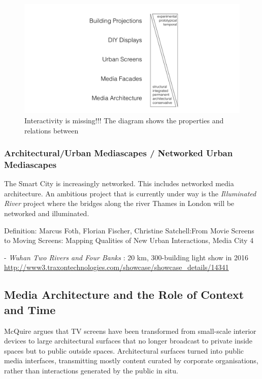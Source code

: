 
\begin{figure}[htp]
\centering
\includegraphics[width=\textwidth]{Illustrations/Typo_diagram.png}
\caption{Interactivity is missing!!! The diagram shows the properties and relations between }
\label{Typo_diagram}
\end{figure}


\subsubsection{Architectural/Urban Mediascapes  / Networked Urban Mediascapes}

The Smart City is increasingly networked. 
This includes networked media architecture.
An ambitious project that is currently under way is the \textit{Illuminated River}  project where the bridges along the river Thames in London will be networked and illuminated.

Definition:
Marcus Foth, Florian Fischer, Christine Satchell:From Movie Screens to Moving Screens: Mapping Qualities of New Urban Interactions, Media City 4


- \textit{Wuhan Two Rivers and Four Banks} : 20 km, 300-building light show in 2016  \url{http://www3.traxontechnologies.com/showcase/showcase_details/14341}



\subsection {Media Architecture and the Role of Context and Time}

McQuire \cite{McQuire2006} argues that TV screens have been transformed from small-scale interior devices to large architectural surfaces that no longer broadcast to private inside spaces but to public outside spaces. Architectural surfaces turned into public media interfaces, transmitting mostly content curated by corporate organisations, rather than interactions generated by the public in situ. 

